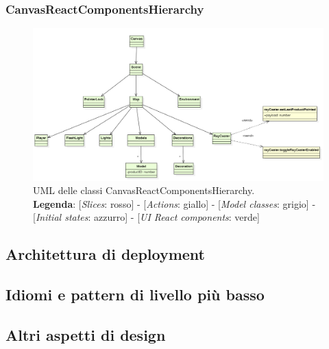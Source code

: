 	\begin{landscape}
		\thispagestyle{empty}
		\subsubsection{CanvasReactComponentsHierarchy}
		\begin{figure}[H]
			\centering
			\includegraphics[scale=0.7 , keepaspectratio]{./res/images/CanvasReactComponentsHierarchy.PNG}
			\caption[UML delle classi CanvasReactComponentsHierarchy]{
			UML delle classi CanvasReactComponentsHierarchy.
			\\
			\textbf{Legenda}: 
			[\textit{Slices}: rosso] -
			[\textit{Actions}: giallo] -
			[\textit{Model classes}: grigio] -
			[\textit{Initial states}: azzurro] -
			[\textit{UI React components}: verde]}
		\end{figure}
	\end{landscape}
	\restoregeometry

\subsection{Architettura di deployment}
\subsection{Idiomi e pattern di livello più basso}
\subsection{Altri aspetti di design}
























